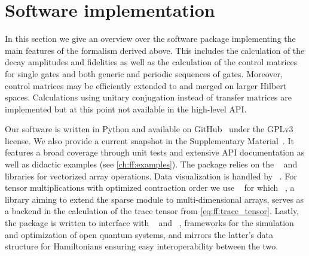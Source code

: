 \chapter{Software implementation}\label{ch:ff:software}
In this section we give an overview over the \filterfunctions software package implementing the main features of the formalism derived above.
This includes the calculation of the decay amplitudes \decayamps and fidelities as well as the calculation of the control matrices for single gates and both generic and periodic sequences of gates.
Moreover, control matrices may be efficiently extended to and merged on larger Hilbert spaces.
Calculations using unitary conjugation instead of transfer matrices are implemented but at this point not available in the high-level API.

Our software is written in Python and available on GitHub~\cite{Hangleiter_ff} under the GPLv3 license.
We also provide a current snapshot in the Supplementary Material~\cite{prrSupp}.
It features a broad coverage through unit tests and extensive API documentation as well as didactic examples (see \cref{ch:ff:examples}).
The package relies on the \numpy~\cite{Harris2020} and \scipy~\cite{Virtanen2020} libraries for vectorized array operations.
Data visualization is handled by \matplotlib~\cite{Hunter2007}.
For tensor multiplications with optimized contraction order we use \opteinsum~\cite{Smith2018} for which \sparse~\cite{Pydata2019}, a library aiming to extend the \scipy sparse module to multi-dimensional arrays, serves as a backend in the calculation of the trace tensor from \cref{eq:ff:trace_tensor}.
Lastly, the package is written to interface with \qopt~\cite{Teske2021,Teske2022} and \qutip~\cite{Johansson2013}, frameworks for the simulation and optimization of open quantum systems, and mirrors the latter's data structure for Hamiltonians ensuring easy interoperability between the two.

